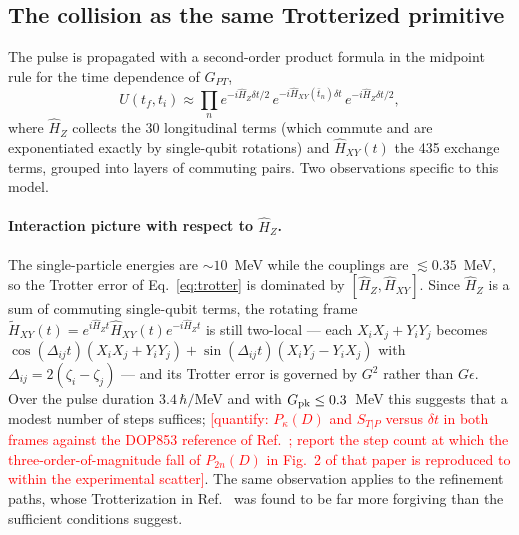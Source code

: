 \documentclass[
  aps,
  prc,
  reprint,
  superscriptaddress,
  floatfix,
  nofootinbib
]{revtex4-2}
\newcommand{\todo}[1]{\textcolor{red}{[#1]}}
\begin{document}
\subsection{The collision as the same Trotterized primitive}
\label{sec:collision}
The pulse is propagated with a second-order product formula in the midpoint
rule for the time dependence of $G_{PT}$,
\begin{equation}
  U(t_f,t_i)\approx\prod_{n}
  e^{-i\hat H_Z\delta t/2}\,e^{-i\hat H_{XY}(\bar t_n)\delta t}\,e^{-i\hat H_Z\delta t/2},
  \label{eq:trotter}
\end{equation}
where $\hat H_Z$ collects the 30 longitudinal terms (which commute and are
exponentiated exactly by single-qubit rotations) and $\hat H_{XY}(t)$ the 435
exchange terms, grouped into layers of commuting pairs.  Two observations
specific to this model.

\paragraph{Interaction picture with respect to $\hat H_Z$.}
The single-particle energies are $\sim10$~MeV while the couplings are
$\lesssim0.35$~MeV, so the Trotter error of Eq.~\eqref{eq:trotter} is
dominated by $[\hat H_Z,\hat H_{XY}]$.  Since $\hat H_Z$ is a sum of
commuting single-qubit terms, the rotating frame
$\tilde H_{XY}(t)=e^{i\hat H_Zt}\hat H_{XY}(t)e^{-i\hat H_Zt}$ is still
two-local --- each $X_iX_j+Y_iY_j$ becomes
$\cos(\Delta_{ij}t)(X_iX_j+Y_iY_j)+\sin(\Delta_{ij}t)(X_iY_j-Y_iX_j)$ with
$\Delta_{ij}=2(\zeta_i-\zeta_j)$ --- and its Trotter error is governed by
$G^2$ rather than $G\epsilon$.  Over the pulse duration $3.4\,\hbar/$MeV
and with $G_{\rm pk}\le0.3$~MeV this suggests that a modest number of steps
suffices; \todo{quantify: $P_\kappa(D)$ and $S_{T|P}$ versus $\delta t$ in
both frames against the DOP853 reference of Ref.~\cite{TwoFragment2026};
report the step count at which the three-order-of-magnitude fall of
$P_{2n}(D)$ in Fig.~2 of that paper is reproduced to within the
experimental scatter}.  The same observation applies to the refinement
paths, whose Trotterization in Ref.~\cite{EigenQPairing2026} was found to
be far more forgiving than the sufficient conditions suggest.
\end{document}
